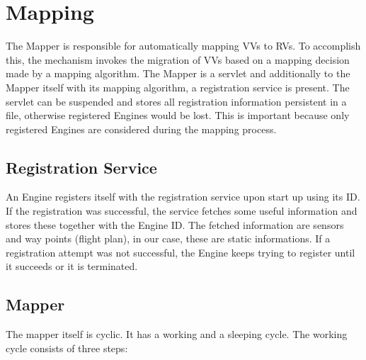 \section{Mapping}
The Mapper is responsible for automatically mapping \acp{VV} to \acp{RV}. To accomplish this, the mechanism invokes 
the migration of \acp{VV} based on a mapping decision made by a mapping algorithm. The Mapper is a servlet and
additionally to the Mapper itself with its mapping algorithm, a registration service is present. The servlet can be suspended and stores all
registration information persistent in a file, otherwise registered Engines would be lost. This is important because only registered 
Engines are considered during the mapping process.

\subsection{Registration Service}
An Engine registers itself with the registration service upon start up using its ID. If the registration was successful, the service
fetches some useful information and stores these together with the Engine ID. The fetched information are sensors and 
way points (flight plan), in our case, these are static informations. If a registration attempt was not successful, the Engine 
keeps trying to register until it succeeds or it is terminated.

\subsection{Mapper}
The mapper itself is cyclic. It has a working and a sleeping cycle.
The working cycle consists of three steps:


